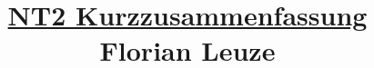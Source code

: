 

\null  %
\nointerlineskip  %
\vfill
\let\snewpage \newpage
\let\newpage \relax
\title{\underline{NT2 Kurzzusammenfassung} \\ $\;$ \\ $\;$ \\ Florian Leuze}
\date{}
\maketitle
\let \newpage \snewpage
\vfill 
\break %

